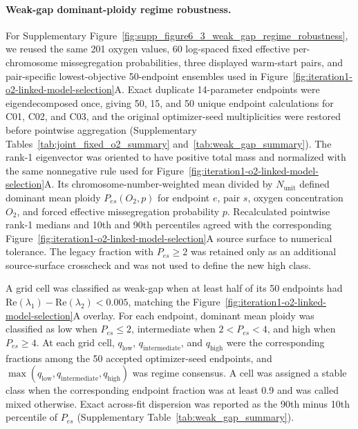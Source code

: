 \documentclass[11pt]{article}
\begin{document}
\paragraph{Weak-gap dominant-ploidy regime robustness.}
For Supplementary Figure~\ref{fig:supp_figure6_3_weak_gap_regime_robustness}, we reused the same 201 oxygen values, 60 log-spaced fixed effective per-chromosome missegregation probabilities, three displayed warm-start pairs, and pair-specific lowest-objective 50-endpoint ensembles used in Figure~\ref{fig:iteration1-o2-linked-model-selection}A. Exact duplicate 14-parameter endpoints were eigendecomposed once, giving 50, 15, and 50 unique endpoint calculations for C01, C02, and C03, and the original optimizer-seed multiplicities were restored before pointwise aggregation (Supplementary Tables~\ref{tab:joint_fixed_o2_summary} and~\ref{tab:weak_gap_summary}). The rank-1 eigenvector was oriented to have positive total mass and normalized with the same nonnegative rule used for Figure~\ref{fig:iteration1-o2-linked-model-selection}A. Its chromosome-number-weighted mean divided by $N_{\mathrm{unit}}$ defined dominant mean ploidy $P_{es}(O_2,p)$ for endpoint $e$, pair $s$, oxygen concentration $O_2$, and forced effective missegregation probability $p$. Recalculated pointwise rank-1 medians and 10th and 90th percentiles agreed with the corresponding Figure~\ref{fig:iteration1-o2-linked-model-selection}A source surface to numerical tolerance. The legacy fraction with $P_{es}\geq2$ was retained only as an additional source-surface crosscheck and was not used to define the new high class.

A grid cell was classified as weak-gap when at least half of its 50 endpoints had $\mathrm{Re}(\lambda_1)-\mathrm{Re}(\lambda_2)<0.005$, matching the Figure~\ref{fig:iteration1-o2-linked-model-selection}A overlay. For each endpoint, dominant mean ploidy was classified as low when $P_{es}\leq2$, intermediate when $2<P_{es}<4$, and high when $P_{es}\geq4$. At each grid cell, $q_{\mathrm{low}}$, $q_{\mathrm{intermediate}}$, and $q_{\mathrm{high}}$ were the corresponding fractions among the 50 accepted optimizer-seed endpoints, and $\max(q_{\mathrm{low}},q_{\mathrm{intermediate}},q_{\mathrm{high}})$ was regime consensus. A cell was assigned a stable class when the corresponding endpoint fraction was at least 0.9 and was called mixed otherwise. Exact across-fit dispersion was reported as the 90th minus 10th percentile of $P_{es}$ (Supplementary Table~\ref{tab:weak_gap_summary}).
\end{document}

